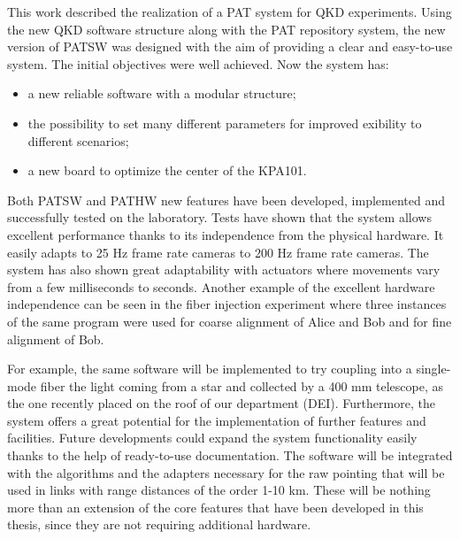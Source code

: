 This work described the realization of a PAT system for QKD experiments. Using the new QKD software structure along with the PAT repository system, the new version of PATSW was designed with the aim of providing a clear and easy-to-use system. The initial objectives were well achieved. Now the system has:
\begin{itemize}
  \item a new reliable software with a modular structure;
  \item the possibility to set many different parameters for improved exibility to different scenarios;
  \item a new board to optimize the center of the KPA101.
\end{itemize}
Both PATSW and PATHW new features have been developed, implemented and
successfully tested on the laboratory. Tests have shown that the system allows excellent performance thanks to its independence from the physical hardware. It easily adapts to 25 Hz frame rate cameras to 200 Hz frame rate cameras. The system has also shown great adaptability with actuators where movements vary from a few milliseconds to seconds. Another example of the excellent hardware independence can be seen in the fiber injection experiment where three instances of the same program were used for coarse alignment of Alice and Bob and for fine alignment of Bob.

For example, the same software will be implemented to try coupling into a single-mode fiber the light coming from a star and collected by a 400 mm telescope, as the one recently placed on the roof of our department (DEI).
Furthermore, the system offers a great potential for the implementation of further
features and facilities. Future developments could expand the system functionality easily thanks to the help of ready-to-use documentation. The software will be integrated with the algorithms and the adapters necessary for the raw pointing that will be used in links with range distances of the order 1-10 km. These will be nothing more than an extension of the core features that have been developed in this thesis, since they are not requiring additional hardware.